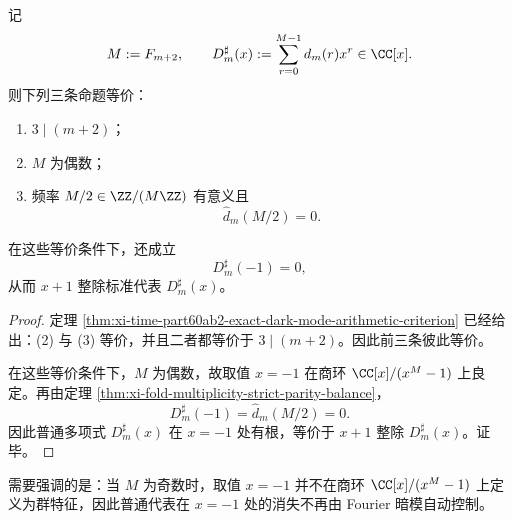 \begin{theorem}\label{thm:xi-time-part9u-minusone-darkmode-even-modulus}
记
\[
M:=F_{m+2},
\qquad
D_m^{\sharp}(x):=\sum_{r=0}^{M-1}d_m(r)x^r\in \CC[x].
\]
则下列三条命题等价：
\begin{enumerate}
  \item \(3\mid (m+2)\)；
  \item \(M\) 为偶数；
  \item 频率 \(M/2\in \ZZ/(M\ZZ)\) 有意义且
  \[
  \widehat d_m(M/2)=0.
  \]
\end{enumerate}
在这些等价条件下，还成立
\[
D_m^{\sharp}(-1)=0,
\]
从而 \(x+1\) 整除标准代表 \(D_m^{\sharp}(x)\)。
\end{theorem}
\begin{proof}
定理 \ref{thm:xi-time-part60ab2-exact-dark-mode-arithmetic-criterion} 已经给出：(2) 与 (3) 等价，并且二者都等价于 \(3\mid (m+2)\)。因此前三条彼此等价。

在这些等价条件下，\(M\) 为偶数，故取值 \(x=-1\) 在商环 \(\CC[x]/(x^M-1)\) 上良定。再由定理 \ref{thm:xi-fold-multiplicity-strict-parity-balance}，
\[
D_m^{\sharp}(-1)=\widehat d_m(M/2)=0.
\]
因此普通多项式 \(D_m^{\sharp}(x)\) 在 \(x=-1\) 处有根，等价于 \(x+1\) 整除 \(D_m^{\sharp}(x)\)。证毕。
\end{proof}

\noindent
需要强调的是：当 \(M\) 为奇数时，取值 \(x=-1\) 并不在商环 \(\CC[x]/(x^M-1)\) 上定义为群特征，因此普通代表在 \(x=-1\) 处的消失不再由 Fourier 暗模自动控制。

